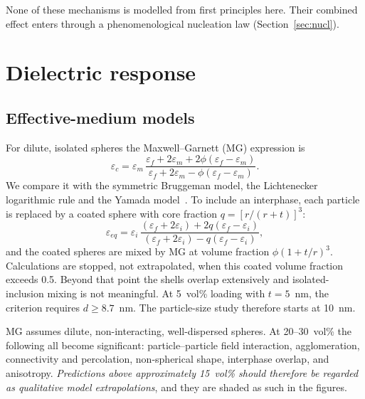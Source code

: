 \documentclass[11pt,a4paper]{article}
\begin{document}
None of these mechanisms is modelled from first principles here. Their combined effect enters through a phenomenological nucleation law (Section~\ref{sec:nucl}).

\section{Dielectric response}

\subsection{Effective-medium models}
For dilute, isolated spheres the Maxwell--Garnett (MG) expression is
\begin{equation}
\varepsilon_c=\varepsilon_m\,\frac{\varepsilon_f+2\varepsilon_m+2\phi(\varepsilon_f-\varepsilon_m)}{\varepsilon_f+2\varepsilon_m-\phi(\varepsilon_f-\varepsilon_m)}.
\label{eq:mg}
\end{equation}
We compare it with the symmetric Bruggeman model, the Lichtenecker logarithmic rule and the Yamada model~\cite{Yamada1982}. To include an interphase, each particle is replaced by a coated sphere with core fraction $q=[r/(r+t)]^3$:
\begin{equation}
\varepsilon_{eq}=\varepsilon_i\,\frac{(\varepsilon_f+2\varepsilon_i)+2q(\varepsilon_f-\varepsilon_i)}{(\varepsilon_f+2\varepsilon_i)-q(\varepsilon_f-\varepsilon_i)},
\end{equation}
and the coated spheres are mixed by MG at volume fraction $\phi(1+t/r)^3$. Calculations are stopped, not extrapolated, when this coated volume fraction exceeds 0.5. Beyond that point the shells overlap extensively and isolated-inclusion mixing is not meaningful. At 5~vol\% loading with $t=5$~nm, the criterion requires $d\ge8.7$~nm. The particle-size study therefore starts at 10~nm.

MG assumes dilute, non-interacting, well-dispersed spheres. At 20--30~vol\% the following all become significant: particle--particle field interaction, agglomeration, connectivity and percolation, non-spherical shape, interphase overlap, and anisotropy. \emph{Predictions above approximately 15~vol\% should therefore be regarded as qualitative model extrapolations}, and they are shaded as such in the figures.
\end{document}
